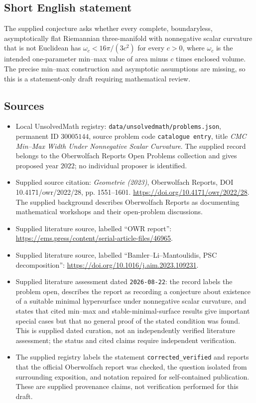 \documentclass[11pt]{article}
\begin{document}
\subsection{Short English statement}
The supplied conjecture asks whether every complete, boundaryless, asymptotically flat Riemannian three-manifold with nonnegative scalar curvature that is not Euclidean has \(\omega_c<16\pi/(3c^2)\) for every \(c>0\), where \(\omega_c\) is the intended one-parameter min--max value of area minus \(c\) times enclosed volume. The precise min--max construction and asymptotic assumptions are missing, so this is a statement-only draft requiring mathematical review.
\subsection{Sources}
\begin{itemize}
\item Local UnsolvedMath registry: \texttt{data/unsolvedmath/problems.json}, permanent ID \(30005144\), source problem code \texttt{catalogue entry}, title \emph{CMC Min--Max Width Under Nonnegative Scalar Curvature}. The supplied record belongs to the Oberwolfach Reports Open Problems collection and gives proposed year \(2022\); no individual proposer is identified.
\item Supplied source citation: \emph{Geometrie (2023)}, Oberwolfach Reports, DOI 10.4171/owr/2022/28, pp. 1551--1601. \url{https://doi.org/10.4171/owr/2022/28}. The supplied background describes Oberwolfach Reports as documenting mathematical workshops and their open-problem discussions.
\item Supplied literature source, labelled ``OWR report'': \url{https://ems.press/content/serial-article-files/46965}.
\item Supplied literature source, labelled ``Bamler--Li--Mantoulidis, PSC decomposition'': \url{https://doi.org/10.1016/j.aim.2023.109231}.
\item Supplied literature assessment dated \texttt{2026-08-22}: the record labels the problem open, describes the report as recording a conjecture about existence of a suitable minimal hypersurface under nonnegative scalar curvature, and states that cited min--max and stable-minimal-surface results give important special cases but that no general proof of the stated condition was found. This is supplied dated curation, not an independently verified literature assessment; the status and cited claims require independent verification.
\item The supplied registry labels the statement \texttt{corrected\_verified} and reports that the official Oberwolfach report was checked, the question isolated from surrounding exposition, and notation repaired for self-contained publication. These are supplied provenance claims, not verification performed for this draft.
\end{itemize}
\end{document}
